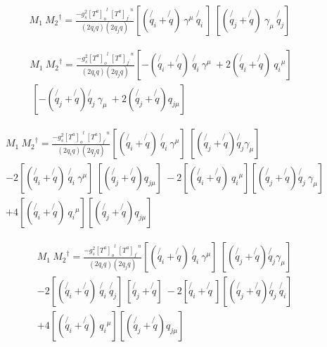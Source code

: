 \begin{equation}
\begin{split}
M_1\: {M_2}^{\dagger} = \frac{-g_s^2 {[T^a]_o}^l \:{[T^a]_{f^{\prime}}}^n }{(2q_i q)(2q_j q)} [(\not{q_i} + \not{q})\: \gamma^{\mu} \:  \not{q_i}\:]
\:[(\not{q_j} + \not{q}) \:\gamma_{\mu} \:\not{q_j} ]\:
\end{split}
\end{equation}


\begin{equation}
\begin{split}
M_1\: {M_2}^{\dagger} = \frac{-g_s^2 {[T^a]_o}^l \:{[T^a]_{f^{\prime}}}^n }{(2q_i q)(2q_j q)} [-(\not{q_i} + \not{q})\:\not{q_i}\: \gamma^{\mu} \:+2(\not{q_i} + \not{q})\:{q_{i}}^{\mu}]\\
\:[-(\not{q_j} + \not{q}) \not{q_j} \:\gamma_{\mu} \: + 2(\not{q_j} + \not{q}) {q_{j{\mu}}}]\:
\end{split}
\end{equation}


\begin{equation}
\begin{split}
&M_1\: {M_2}^{\dagger} = \frac{-g_s^2 {[T^a]_o}^l \:{[T^a]_{f^{\prime}}}^n }{(2q_i q)(2q_j q)} 
[(\not{q_i} + \not{q})\:\not{q_i}\: \gamma^{\mu}] \:[(\not{q_j} + \not{q}) \not{q_j} \gamma_{\mu}] \\
&-2[(\not{q_i} + \not{q})\:\not{q_i}\: \gamma^{\mu}]\:[ (\not{q_j} + \not{q}) {q_{j{\mu}}}]
\:-2[(\not{q_i} + \not{q})\:{q_{i}}^{\mu}][(\not{q_j} + \not{q}) \not{q_j} \:\gamma_{\mu}]\\
&+4[(\not{q_i} + \not{q})\:{q_{i}}^{\mu}][(\not{q_j} + \not{q}) {q_{j{\mu}}}]
\end{split}
\end{equation}

\begin{equation}
\begin{split}
&M_1\: {M_2}^{\dagger} = \frac{-g_s^2 {[T^a]_o}^l \:{[T^a]_{f^{\prime}}}^n }{(2q_i q)(2q_j q)} 
[(\not{q_i} + \not{q})\:\not{q_i}\: \gamma^{\mu}] \:[(\not{q_j} + \not{q}) \not{q_j} \gamma_{\mu}] \\
&-2[(\not{q_i} + \not{q})\:\not{q_i}\:\not{q_{j}} ]\:[ \not{q_j} + \not{q} ]
\:-2[\not{q_i} + \not{q}\:][(\not{q_j} + \not{q}) \not{q_j} \:\not{q_i}]\\
&+4[(\not{q_i} + \not{q})\:{q_{i}}^{\mu}][(\not{q_j} + \not{q}) {q_{j{\mu}}}]
\end{split}
\end{equation}

